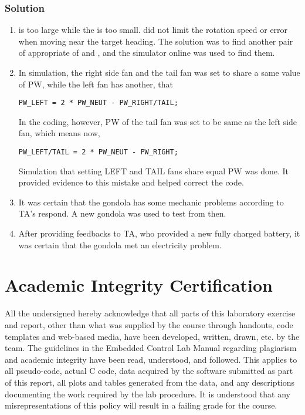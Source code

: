 \documentclass[12pt]{article}
\newcommand\code[2][]{
    \tikz[baseline=(s.base)]{
        \node(s)[
            rounded corners,
            fill=black!5,        %
            draw=black,          %
            text=black, %
            inner xsep =3pt,    %
            inner ysep =0pt,    %
            text height=2ex,    %
            text depth =1ex,    %
            #1                  %
        ]{\texttt{#2}};
    }
}
\begin{document}
\subsubsection{Solution}
\begin{enumerate}
\item \code{KP} is too large while the \code{KD} is too small. \code{KD} did not limit the rotation speed or error when moving near the target heading. The solution was to find another pair of appropriate of \code{KP} and \code{KD}, and the simulator online was used to find them.
\item  In simulation, the right side fan and the tail fan was set to share a same value of PW, while the left fan has another, that
\begin{lstlisting}
PW_LEFT = 2 * PW_NEUT - PW_RIGHT/TAIL;
\end{lstlisting}
In the coding, however, PW of the tail fan was set to be same as the left side fan, which means now,
\begin{lstlisting}
PW_LEFT/TAIL = 2 * PW_NEUT - PW_RIGHT;
\end{lstlisting}
Simulation that setting LEFT and TAIL fans share equal PW was done. It provided evidence to this mistake and helped correct the code.
\item It was certain that the gondola has some mechanic problems according to TA’s respond. A new gondola was used to test from then.
\item After providing feedbacks to TA, who provided a new fully charged battery, it was certain that the gondola met an electricity problem.
\end{enumerate}

\newpage
\section{Academic Integrity Certification}
All the undersigned hereby acknowledge that all parts of this laboratory exercise and report, other than what was supplied by the course through handouts, code templates and web-based media, have been developed, written, drawn, etc. by the team. The guidelines in the Embedded Control Lab Manual regarding plagiarism and academic integrity have been read, understood, and followed. This applies to all pseudo-code, actual C code, data acquired by the software submitted as part of this report, all plots and tables generated from the data, and any descriptions documenting the work required by the lab procedure. It is understood that any misrepresentations of this policy will result in a failing grade for the course.
\newpage
\end{document}
